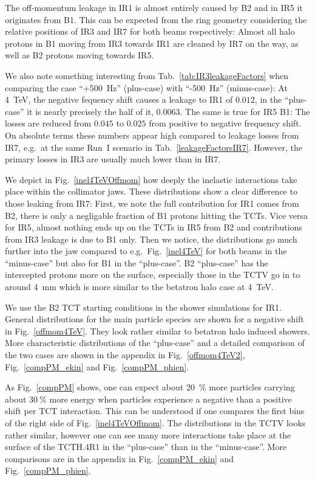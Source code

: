 The off-momentum leakage in IR1 is almost entirely caused by B2 and in IR5 it originates from B1. This can be expected from the ring geometry considering the relative positions of IR3 and IR7 for both beams respectively: Almost all halo protons in B1 moving from IR3 towards IR1 are cleaned by IR7 on the way, as well as B2 protons moving towards IR5.

We also note something interesting from Tab.~\ref{tab:IR3leakageFactors} when comparing the case ``+500~Hz'' (plus-case) with ``-500~Hz'' (minus-case): At 4~TeV, the negative fequency shift causes a leakage to IR1 of $0.012$, in the ``plus-case'' it is nearly precisely the half of it, $0.0063$. The same is true for IR5 B1: The losses are reduced from $0.045$ to $0.025$ from positive to negative frequency shift. On absolute terms these numbers appear high compared to leakage losses from IR7, e.g.~at the same Run~I scenario in Tab.~\ref{leakageFactorsIR7}. However, the primary losses in IR3 are usually much lower than in IR7.

We depict in Fig.~\ref{inel4TeVOffmom} how deeply the inelastic interactions take place within the collimator jaws. These distributions show a clear difference to those leaking from IR7: First, we note the full contribution for IR1 comes from B2, there is only a negligable fraction of B1 protons hitting the TCTs. Vice versa for IR5, almost nothing ends up on the TCTs in IR5 from B2 and contributions from IR3 leakage is due to B1 only. Then we notice, the distributions go much further into the jaw compared to e.g.~Fig.~\ref{inel4TeV} for both beams in the ``minus-case'' but also for B1 in the ``plus-case''. B2 ``plus-case'' has the intercepted protons more on the surface, especially those in the TCTV go in to around 4~mm which is more similar to the betatron halo case at 4~TeV. 

We use the B2 TCT starting conditions in the shower simulations for IR1. General distributions for the main particle species are shown for a negative shift in Fig.~\ref{offmom4TeV}. They look rather similar to betatron halo induced showers. More characteristic distributions of the ``plus-case'' and a detailed comparison of the two cases are shown in the appendix in Fig.~\ref{offmom4TeV2}, Fig.~\ref{compPM_ekin} and Fig.~\ref{compPM_phien}.

As Fig.~\ref{compPM} shows, one can expect about 20~$\%$ more particles carrying about 30$~\%$ more energy when particles experience a negative than a positive shift per TCT interaction. This can be understood if one compares the first bins of the right side of Fig.~\ref{inel4TeVOffmom}. The distributions in the TCTV looks rather similar, however one can see many more interactions take place at the surface of the TCTH.4R1 in the ``plus-case'' than in the ``minus-case''. More comparisons are in the appendix in Fig.~\ref{compPM_ekin} and Fig.~\ref{compPM_phien}.



